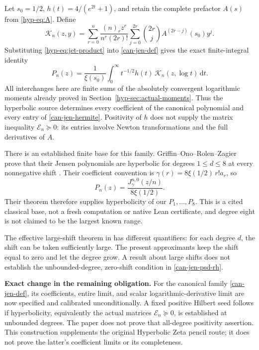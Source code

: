 \documentclass[11pt,a4paper]{article}
\numberwithin{equation}{section}
\theoremstyle{definition}
\theoremstyle{remark}
\newcommand{\dd}{\,\mathrm d}
\begin{document}
Let $s_0=1/2$, $h(t)=4/(e^{2t}+1)$, and retain the complete prefactor
$A(s)$ from \eqref{hyp-eq:A}. Define
\begin{equation}\label{can-jen-source-kernel}
 \mathcal K_n(z,y)=
 \sum_{r=0}^{n}\frac{(n)_r z^r}{n^r(2r)!}
 \sum_{j=0}^{2r}\binom{2r}{j}A^{(2r-j)}(s_0)y^j.
\end{equation}
Substituting \eqref{hyp-eq:jet-product} into \eqref{can-jen-def} gives
the exact finite-integral identity
\begin{equation}\label{can-jen-source}
 P_n(z)=\frac1{\xi(s_0)}
 \int_0^\infty t^{-1/2}h(t)\,
                   \mathcal K_n(z,\log t)\dd t.
\end{equation}
All interchanges here are finite sums of the absolutely convergent
logarithmic moments already proved in Section~\ref{hyp-sec:actual-moments}.
Thus the hyperbolic source determines every coefficient of the canonical
polynomial and every entry of \eqref{can-jen-hermite}. Positivity of
$h$ does not supply the matrix inequality
$\mathcal E_n\succeq0$: its entries involve Newton transformations
and the full derivatives of $A$.

There is an established finite base for this family. Griffin--Ono--Rolen--Zagier
prove that their Jensen polynomials are hyperbolic for degrees
$1\leq d\leq8$ at every nonnegative shift
\cite[Theorem~2]{gorz-jensen}. Their coefficient convention is
$\gamma(r)=8\xi(1/2)\,r!a_r$, so
\[
 P_n(z)=\frac{J_{\gamma}^{n,0}(z/n)}{8\xi(1/2)}.
\]
Their theorem therefore supplies hyperbolicity of our $P_1,\ldots,P_8$.
This is a cited classical base, not a fresh computation or native Lean
certificate, and degree eight is not claimed to be the largest known range.

The effective large-shift theorem in \cite[Theorem~1.1]{gorttw-jensen}
has different quantifiers: for each degree $d$, the shift can be taken
sufficiently large. The present approximants keep the shift equal to
zero and let the degree grow. A result about large shifts does not
establish the unbounded-degree, zero-shift condition
in \eqref{can-jen-psd-rh}.

\begin{scopebox}
\small\textbf{Exact change in the remaining obligation.}
For the canonical family \eqref{can-jen-def}, its coefficients, entire
limit, and scalar logarithmic-derivative limit are now specified and
calibrated unconditionally. A fixed positive Hilbert seed follows if
hyperbolicity, equivalently the actual matrices
$\mathcal E_n\succeq0$, is established at unbounded degrees.
The paper does not prove that all-degree positivity assertion.
This construction supplements the original Hyperbolic Zeta pencil route;
it does not prove the latter's coefficient limits or its completeness.
\end{scopebox}
\end{document}
